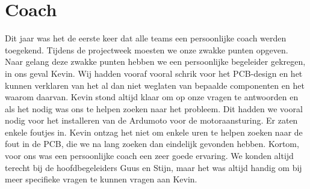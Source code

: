 \chapter{Coach}
Dit jaar was het de eerste keer dat alle teams een persoonlijke coach werden toegekend. Tijdens de projectweek moesten we onze zwakke punten opgeven. Naar gelang deze zwakke punten hebben we een persoonlijke begeleider gekregen, in ons geval Kevin. Wij hadden vooraf vooral schrik voor het PCB-design en het kunnen verklaren van het al dan niet weglaten van bepaalde componenten en het waarom daarvan. Kevin stond altijd klaar om op onze vragen te antwoorden en als het nodig was ons te helpen zoeken naar het probleem. Dit hadden we vooral nodig voor het installeren van de Ardumoto voor de motoraansturing. Er zaten enkele foutjes in. Kevin ontzag het niet om enkele uren te helpen zoeken naar de fout in de PCB, die we na lang zoeken dan eindelijk gevonden hebben. Kortom, voor ons was een persoonlijke coach een zeer goede ervaring. We konden altijd terecht bij de hoofdbegeleiders Guus en Stijn, maar het was altijd handig om bij meer specifieke vragen te kunnen vragen aan Kevin.